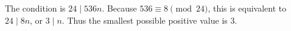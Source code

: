 The condition is $24\mid 536n$. Because $536\equiv 8\pmod{24}$, this is equivalent to $24\mid 8n$, or $3\mid n$. Thus the smallest possible positive value is $\boxed{3}$.
